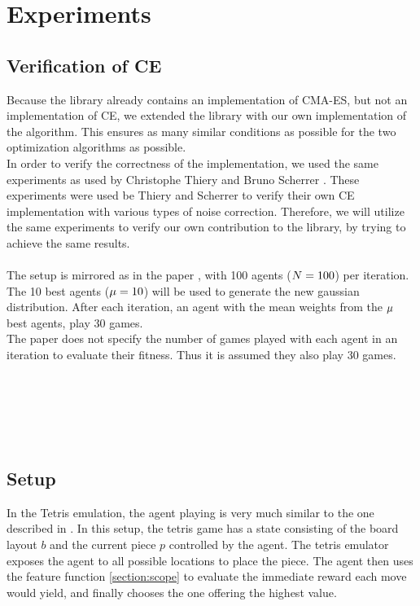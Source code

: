 \section{Experiments}


\subsection{Verification of CE}
Because the \shark library already contains an implementation of CMA-ES, but not an implementation of CE, we extended the library with our own implementation of the algorithm. This ensures as many similar conditions as possible for the two optimization algorithms as possible.\\
In order to verify the correctness of the implementation, we used the same experiments as used by Christophe Thiery and Bruno Scherrer \citep{thiery:09}. These experiments were used be Thiery and Scherrer to verify their own CE implementation with various types of noise correction. Therefore, we will utilize the same experiments to verify our own contribution to the \shark library, by trying to achieve the same results.\\
\\
The setup is mirrored as in the paper \citep{thiery:09}, with 100 agents ($N = 100$) per iteration. The 10 best agents ($\mu = 10$) will be used to generate the new gaussian distribution. After each iteration, an agent with the mean weights from the $\mu$ best agents, play 30 games.\\
The paper does not specify the number of games played with each agent in an iteration to evaluate their fitness. Thus it is assumed they also play 30 games.\\
\\
\\
\\
\\
\\

\subsection{Setup}

In the Tetris emulation, the agent playing is 
very much similar to the one described in \citep{scherrer2015}.
In this setup, the tetris game has a state consisting of the 
board layout $b$ and the current piece $p$ controlled by the agent.
The tetris emulator \cite{mdptetris} exposes the agent to all 
possible locations to place the piece. The agent then uses the 
feature function \ref{section:scope} to evaluate the immediate
reward each move would yield, and finally chooses the one offering 
the highest value.

